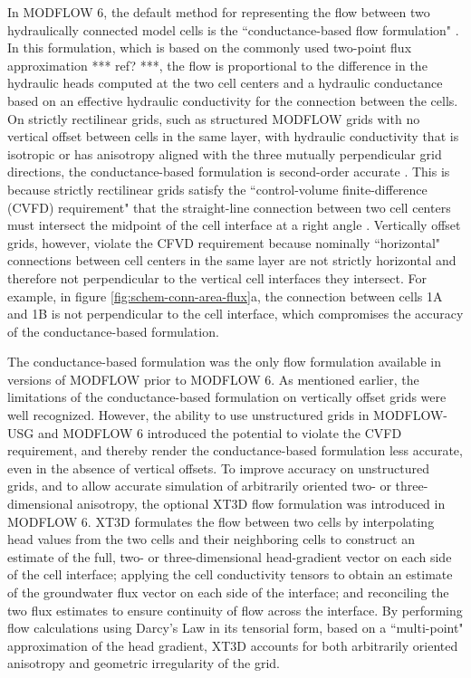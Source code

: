 \documentclass{article}
\begin{document}
In MODFLOW 6, the default method for representing the flow between two hydraulically connected model cells is the ``conductance-based flow formulation" \citep{modflow6gwf}. In this formulation, which is based on the commonly used two-point flux approximation {\color{red} *** ref? ***}, the flow is proportional to the difference in the hydraulic heads computed at the two cell centers and a hydraulic conductance based on an effective hydraulic conductivity for the connection between the cells. On strictly rectilinear grids, such as structured MODFLOW grids with no vertical offset between cells in the same layer, with hydraulic conductivity that is isotropic or has anisotropy aligned with the three mutually perpendicular grid directions, the conductance-based formulation is second-order accurate \citep{dehotin2010modeling, modflow6gwf}. This is because strictly rectilinear grids satisfy the ``control-volume finite-difference (CVFD) requirement" that the straight-line connection between two cell centers must intersect the midpoint of the cell interface at a right angle \citep{narasimhan1976integrated}. Vertically offset grids, however, violate the CFVD requirement because nominally ``horizontal" connections between cell centers in the same layer are not strictly horizontal and therefore not perpendicular to the vertical cell interfaces they intersect. For example, in figure \ref{fig:schem-conn-area-flux}a, the connection between cells 1A and 1B is not perpendicular to the cell interface, which compromises the accuracy of the conductance-based formulation.

The conductance-based formulation was the only flow formulation available in versions of MODFLOW prior to MODFLOW 6. As mentioned earlier, the limitations of the conductance-based formulation on vertically offset grids were well recognized. However, the ability to use unstructured grids in MODFLOW-USG and MODFLOW 6 introduced the potential to violate the CVFD requirement, and thereby render the conductance-based formulation less accurate, even in the absence of vertical offsets. To improve accuracy on unstructured grids, and to allow accurate simulation of arbitrarily oriented two- or three-dimensional anisotropy, the optional XT3D flow formulation \citep{modflow6xt3d} was introduced in MODFLOW 6. XT3D formulates the flow between two cells by interpolating head values from the two cells and their neighboring cells to construct an estimate of the full, two- or three-dimensional head-gradient vector on each side of the cell interface; applying the cell conductivity tensors to obtain an estimate of the groundwater flux vector on each side of the interface; and reconciling the two flux estimates to ensure continuity of flow across the interface. By performing flow calculations using Darcy's Law in its tensorial form, based on a ``multi-point" approximation of the head gradient, XT3D accounts for both arbitrarily oriented anisotropy and geometric irregularity of the grid.
\end{document}
